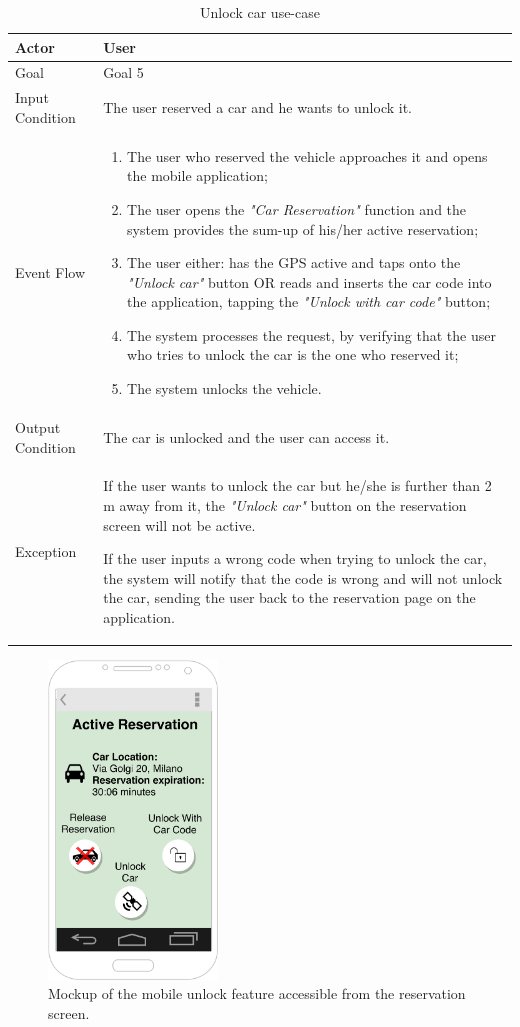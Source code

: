 \begin{table}[H]
\begin{center}
\begin{tabular}{p{} | p{}}
\hline
Actor & User\\
\hline
Goal & Goal 5\\
\hline
Input Condition & The user reserved a car and he wants to unlock it.\\
\hline
Event Flow & 
\begin{enumerate}
\item The user who reserved the vehicle approaches it and opens the mobile application;
\item The user opens the \emph{"Car Reservation"} function and the system provides the sum-up of his/her active reservation;
\item The user either: has the GPS active and taps onto the \emph{"Unlock car"} button OR reads and inserts the car code into the application, tapping the \emph{"Unlock with car code"} button;
\item The system processes the request, by verifying that the user who tries to unlock the car is the one who reserved it;
\item The system unlocks the vehicle.
\end{enumerate} \\
\hline
Output Condition & The car is unlocked and the user can access it.\\
\hline
Exception & If the user wants to unlock the car but he/she is further than 2 m away from it, the \emph{"Unlock car"} button on the reservation screen will not be active.

If the user inputs a wrong code when trying to unlock the car, the system will notify that the code is wrong and will not unlock the car, sending the user back to the reservation page on the application.\\
\hline
\end{tabular}
\end{center}
\caption{Unlock car use-case}
\label{unlock_car_uc}
\end{table}

\begin{figure}[H]
\begin{center}
		\includegraphics[width=0.4\textwidth]{./specific_requirements/features/diagrams/mobile_unlock.png}
		\caption{Mockup of the mobile unlock feature accessible from the reservation screen.}
		\label{mobile_unlock}
\end{center}
\end{figure}